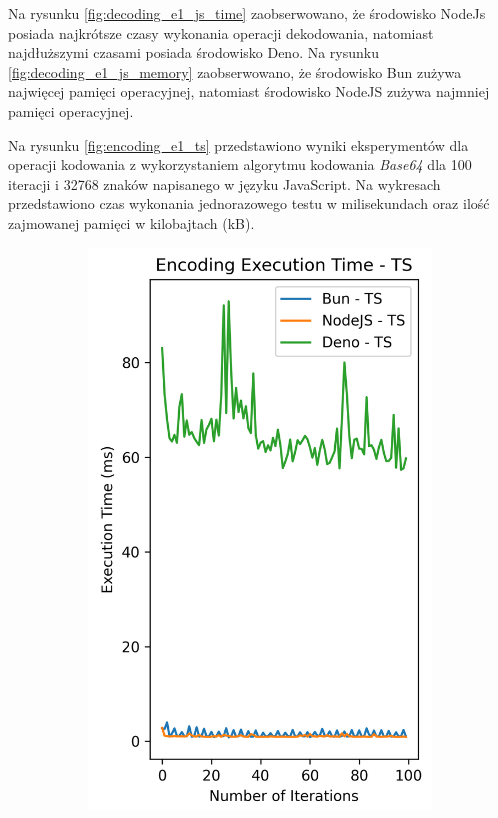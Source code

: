 Na rysunku \ref{fig:decoding_e1_js_time} zaobserwowano, że środowisko NodeJs posiada najkrótsze czasy wykonania operacji dekodowania, natomiast najdłuższymi czasami posiada środowisko Deno. Na rysunku \ref{fig:decoding_e1_js_memory} zaobserwowano, że środowisko Bun zużywa najwięcej pamięci operacyjnej, natomiast środowisko NodeJS zużywa najmniej pamięci operacyjnej.

Na rysunku \ref{fig:encoding_e1_ts} przedstawiono wyniki eksperymentów dla operacji kodowania z wykorzystaniem algorytmu kodowania \textit{Base64} dla 100 iteracji i 32768 znaków napisanego w języku JavaScript. Na wykresach przedstawiono czas wykonania jednorazowego testu w milisekundach oraz ilość zajmowanej pamięci w kilobajtach (kB).

\begin{figure}[H]
  \centering
  \begin{subfigure}[b]{0.42\textwidth}
    \centering
    \includegraphics[width=\textwidth]{Figures/coding/base64_100_encoding_ts_time.png}

\end{subfigure}
\end{figure}
